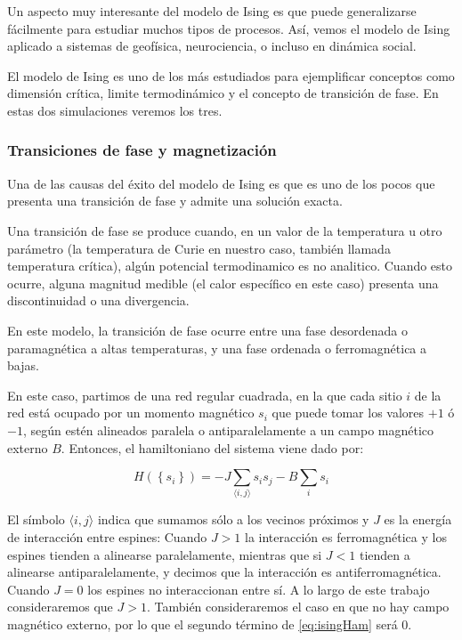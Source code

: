 \documentclass[11pt, a4paper]{article} %
\theoremstyle{named}
\begin{document}
Un aspecto muy interesante del modelo de Ising es que puede generalizarse fácilmente para estudiar muchos tipos de procesos. Así, vemos el modelo de Ising aplicado a sistemas de geofísica, neurociencia, o incluso en dinámica social.

El modelo de Ising es uno de los más estudiados para ejemplificar conceptos como dimensión crítica, limite termodinámico y el concepto de transición de fase. En estas dos simulaciones veremos los tres.

\subsubsection{Transiciones de fase y magnetización}\label{sec:transiciones}

Una de las causas del éxito del modelo de Ising es que es uno de los pocos que presenta una transición de fase y admite una solución exacta.

Una transición de fase se produce cuando, en un valor de la temperatura u otro parámetro (la temperatura de Curie en nuestro caso, también llamada temperatura crítica), algún potencial termodinamico es no analitico. Cuando esto ocurre, alguna magnitud medible (el calor específico en este caso) presenta una discontinuidad o una divergencia.

En este modelo, la transición de fase ocurre entre una fase desordenada o paramagnética a altas temperaturas, y una fase ordenada o ferromagnética a bajas.

En este caso, partimos de una red regular cuadrada, en la que cada sitio $i$ de la red está ocupado por un momento magnético $s_i$ que puede tomar los valores $+1$ ó $-1$, según estén alineados paralela o antiparalelamente a un campo magnético externo $B$. Entonces, el hamiltoniano del sistema viene dado por:

\begin{equation}\label{eq:isingHam}
H\left(\left\{s_{i}\right\}\right)=-J \sum_{\langle i, j\rangle} s_{i} s_{j} - B \sum_i s_i
\end{equation}

El símbolo $\langle i, j\rangle$ indica que sumamos sólo a los vecinos próximos y $J$ es la energía de interacción entre espines: Cuando $J > 1$ la interacción es ferromagnética y los espines tienden a alinearse paralelamente, mientras que si $J<1$ tienden a alinearse antiparalelamente, y decimos que la interacción es antiferromagnética. Cuando $J=0$ los espines no interaccionan entre sí. A lo largo de este trabajo consideraremos que $J>1$. También consideraremos el caso en que no hay campo magnético externo, por lo que el segundo término de \eqref{eq:isingHam} será $0$.
\end{document}

